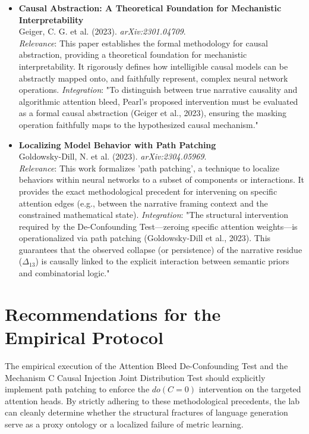 \documentclass[12pt]{article}
\begin{document}
\begin{itemize}
    \item \textbf{Causal Abstraction: A Theoretical Foundation for Mechanistic Interpretability} \\
    Geiger, C. G. et al. (2023). \textit{arXiv:2301.04709}. \\
    \textit{Relevance}: This paper establishes the formal methodology for causal abstraction, providing a theoretical foundation for mechanistic interpretability. It rigorously defines how intelligible causal models can be abstractly mapped onto, and faithfully represent, complex neural network operations.
    \textit{Integration}: "To distinguish between true narrative causality and algorithmic attention bleed, Pearl's proposed intervention must be evaluated as a formal causal abstraction (Geiger et al., 2023), ensuring the masking operation faithfully maps to the hypothesized causal mechanism."

    \item \textbf{Localizing Model Behavior with Path Patching} \\
    Goldowsky-Dill, N. et al. (2023). \textit{arXiv:2304.05969}. \\
    \textit{Relevance}: This work formalizes 'path patching', a technique to localize behaviors within neural networks to a subset of components or interactions. It provides the exact methodological precedent for intervening on specific attention edges (e.g., between the narrative framing context and the constrained mathematical state).
    \textit{Integration}: "The structural intervention required by the De-Confounding Test—zeroing specific attention weights—is operationalized via path patching (Goldowsky-Dill et al., 2023). This guarantees that the observed collapse (or persistence) of the narrative residue ($\Delta_{13}$) is causally linked to the explicit interaction between semantic priors and combinatorial logic."

\end{itemize}

\section{Recommendations for the Empirical Protocol}
The empirical execution of the Attention Bleed De-Confounding Test and the Mechanism C Causal Injection Joint Distribution Test should explicitly implement path patching to enforce the $do(C=0)$ intervention on the targeted attention heads. By strictly adhering to these methodological precedents, the lab can cleanly determine whether the structural fractures of language generation serve as a proxy ontology or a localized failure of metric learning.
\end{document}
